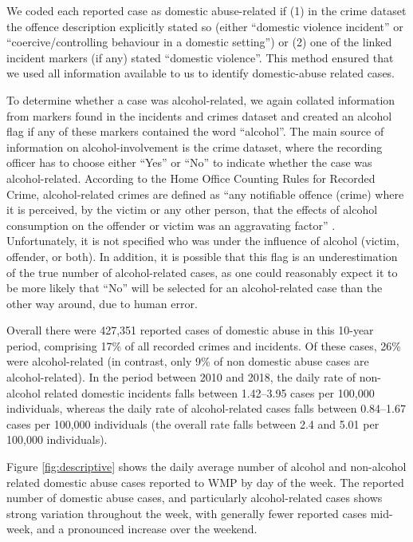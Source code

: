 \documentclass[12pt, a4paper]{article}
\begin{document}
We coded each reported case as domestic abuse-related if (1) in the crime dataset the offence description explicitly stated so (either ``domestic violence incident'' or ``coercive/controlling behaviour in a domestic setting'') or (2) one of the linked incident markers (if any) stated ``domestic violence''. This method ensured that we used all information available to us to identify domestic-abuse related cases. 

To determine whether a case was alcohol-related, we again collated information from markers found in the incidents and crimes dataset and created an alcohol flag if any of these markers contained the word ``alcohol''. The main source of information on alcohol-involvement is the crime dataset, where the recording officer has to choose either ``Yes'' or ``No'' to indicate whether the case was alcohol-related. According to the Home Office Counting Rules for Recorded Crime, alcohol-related crimes are defined as ``any notifiable offence (crime) where it is perceived, by the victim or any other person, that the
effects of alcohol consumption on the offender or victim was an aggravating factor'' \cite{Office2019}. Unfortunately, it is not specified who was under the influence of alcohol (victim, offender, or both). In addition, it is possible that this flag is an underestimation of the true number of alcohol-related cases, as one could reasonably expect it to be more likely that ``No'' will be selected for an alcohol-related case than the other way around, due to human error.

 Overall there were 427,351 reported cases of domestic abuse in this 10-year period, comprising 17\% of all recorded crimes and incidents. Of these cases, 26\% were alcohol-related (in contrast, only 9\% of non domestic abuse cases are alcohol-related). In the period between 2010 and 2018, the daily rate of non-alcohol related domestic incidents falls between 1.42--3.95 cases per 100,000 individuals, whereas the daily rate of alcohol-related cases falls between 0.84--1.67 cases per 100,000 individuals (the overall rate falls between 2.4 and 5.01 per 100,000 individuals). 

Figure \ref{fig:descriptive} shows the daily average number of alcohol and non-alcohol related domestic abuse cases reported to WMP by day of the week. The reported number of domestic abuse cases, and particularly alcohol-related cases shows strong variation throughout the week, with generally fewer reported cases mid-week, and a pronounced increase over the weekend. 
\end{document}
